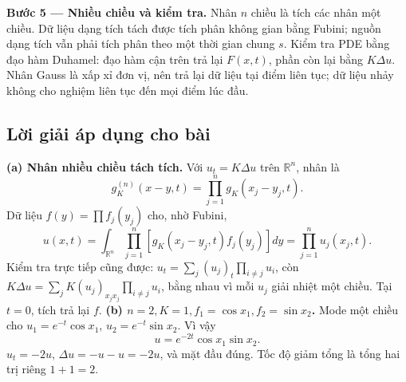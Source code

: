 \documentclass[10pt,a4paper]{article}
\begin{document}
\textbf{Bước 5 — Nhiều chiều và kiểm tra.} Nhân $n$ chiều là tích các nhân một chiều. Dữ liệu dạng tích tách được tích phân không gian bằng Fubini; nguồn dạng tích vẫn phải tích phân theo một thời gian chung $s$. Kiểm tra PDE bằng đạo hàm Duhamel: đạo hàm cận trên trả lại $F(x,t)$, phần còn lại bằng $K\Delta u$. Nhân Gauss là xấp xỉ đơn vị, nên trả lại dữ liệu tại điểm liên tục; dữ liệu nhảy không cho nghiệm liên tục đến mọi điểm lúc đầu.
\subsection*{Lời giải áp dụng cho bài}
\textbf{(a) Nhân nhiều chiều tách tích.}
Với $u_t=K\Delta u$ trên $\mathbb R^n$, nhân là
\[g_K^{(n)}(x-y,t)=\prod_{j=1}^n g_K(x_j-y_j,t).\]
Dữ liệu $f(y)=\prod f_j(y_j)$ cho, nhờ Fubini,
\[u(x,t)=\int_{\mathbb R^n}\prod_{j=1}^n[g_K(x_j-y_j,t)f_j(y_j)]dy
=\prod_{j=1}^nu_j(x_j,t).\]
Kiểm tra trực tiếp cũng được: $u_t=\sum_j(u_j)_t\prod_{i\ne j}u_i$, còn $K\Delta u=\sum_jK(u_j)_{x_jx_j}\prod_{i\ne j}u_i$, bằng nhau vì mỗi $u_j$ giải nhiệt một chiều. Tại $t=0$, tích trả lại $f$.
\textbf{(b) $n=2,K=1,f_1=\cos x_1,f_2=\sin x_2$.}
Mode một chiều cho $u_1=e^{-t}\cos x_1$, $u_2=e^{-t}\sin x_2$. Vì vậy
\[u=e^{-2t}\cos x_1\sin x_2.\]
$u_t=-2u$, $\Delta u=-u-u=-2u$, và mặt đầu đúng. Tốc độ giảm tổng là tổng hai trị riêng $1+1=2$.
\end{document}
